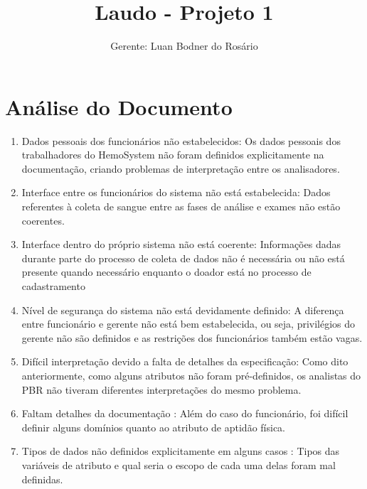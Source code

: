 \documentclass[12pt,a4paper,final]{report}
\author{Gerente: Luan Bodner do Rosário}
\title{Laudo - Projeto 1}
\begin{document}
\maketitle
\section*{Análise do Documento}
\begin{enumerate}
\item Dados pessoais dos funcionários não estabelecidos: Os dados pessoais dos trabalhadores do HemoSystem não foram definidos explicitamente na documentação, criando problemas de interpretação entre os analisadores.

\item Interface entre os funcionários do sistema não está estabelecida: Dados referentes à coleta de sangue entre as fases de análise e exames não estão coerentes.

\item Interface dentro do próprio sistema não está coerente: Informações dadas durante parte do processo de coleta de dados não é necessária ou não está presente quando necessário enquanto o doador está no processo de cadastramento

\item Nível de segurança do sistema não está devidamente definido: A diferença entre funcionário e gerente não está bem estabelecida, ou seja, privilégios do gerente não são definidos e as restrições dos funcionários também estão vagas.

\item Difícil interpretação devido a falta de detalhes da especificação: Como dito anteriormente, como alguns atributos não foram pré-definidos, os analistas do PBR não tiveram diferentes interpretações do mesmo problema.

\item Faltam detalhes da documentação : Além do caso do funcionário, foi difícil definir alguns domínios quanto ao atributo de aptidão física.

\item Tipos de dados não definidos explicitamente em alguns casos : Tipos das variáveis de atributo e qual seria o escopo de cada uma delas foram mal definidas.
\end{enumerate}
\newpage
\end{document}
